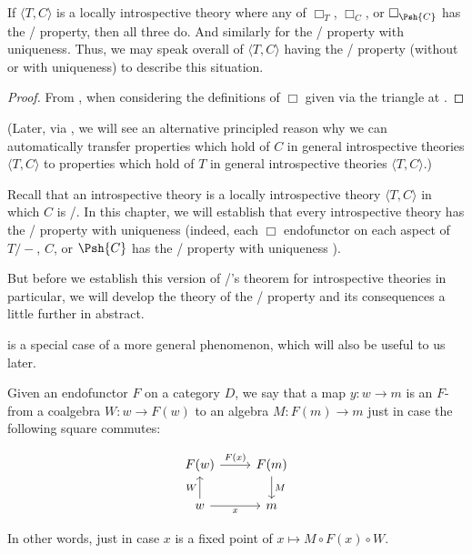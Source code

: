 \begin{corollary}\label{LoebTransferIntrosp}
If $\langle T, C \rangle$ is a locally introspective theory where any of $\Box_T$, $\Box_C$, or $\Box_{\Psh{C}}$ has the \Loeb/ property, then all three do. And similarly for the \Loeb/ property with uniqueness. Thus, we may speak overall of $\langle T, C \rangle$ having the \Loeb/ property (without or with uniqueness) to describe this situation.
\end{corollary}
\begin{proof}
From , when considering the definitions of $\Box$ given via the triangle at .
\end{proof}

(Later, via , we will see an alternative principled reason why we can automatically transfer properties which hold of $C$ in general introspective theories $\langle T, C \rangle$ to properties which hold of $T$ in general introspective theories $\langle T, C \rangle$.)

\bigskip
Recall that an introspective theory is a locally introspective theory $\langle T, C \rangle$ in which $C$ is \repsmall/. In this chapter, we will establish that every introspective theory has the \Loeb/ property with uniqueness (indeed, each $\Box$ endofunctor on each aspect of $T/-$, $C$, or $\Psh{C}$ has the \Loeb/ property with uniqueness ).

But before we establish this version of \Loeb/'s theorem for introspective theories in particular, we will develop the theory of the \Loeb/ property and its consequences a little further in abstract.

 is a special case of a more general phenomenon, which will also be useful to us later.

\begin{definition}
Given an endofunctor $F$ on a category $D$, we say that a map $y : w \to m$ is an $F$- from a coalgebra $W : w \to F(w)$ to an algebra $M : F(m) \to m$ just in case the following square commutes:

\[\begin{tikzcd}
	{F(w)} & {F(m)} \\
	w & m
	\arrow["W", from=2-1, to=1-1]
	\arrow["{F(x)}", from=1-1, to=1-2]
	\arrow["M", from=1-2, to=2-2]
	\arrow["x"', from=2-1, to=2-2]
\end{tikzcd}\]

In other words, just in case $x$ is a fixed point of $x \mapsto M \circ F(x) \circ W$.
\end{definition}

